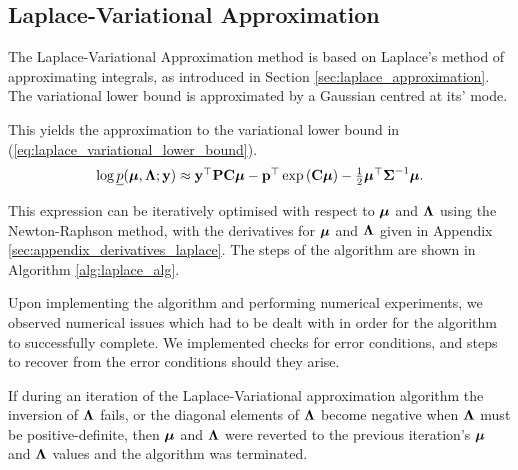\subsection{Laplace-Variational Approximation}
The Laplace-Variational Approximation method is based on Laplace's method of approximating integrals, as
introduced in Section \ref{sec:laplace_approximation}. The variational lower bound  is approximated by a
Gaussian centred at its' mode.

This yields the approximation to the variational lower bound in (\ref{eq:laplace_variational_lower_bound}).
\begin{equation}
\label{eq:laplace_variational_lower_bound}
\begin{array}{ll}
	\log \underline{p}({\boldsymbol \mu}, {\boldsymbol \Lambda}; {\bf y}) \approx {\bf y}^\top{\bf P}{\bf C}{\boldsymbol\mu} - {\bf p}^\top\exp \left ({\bf C} {\boldsymbol \mu} \right ) - \tfrac{1}{2} {\boldsymbol \mu}^\top {\boldsymbol\Sigma}^{-1} {\boldsymbol \mu}. 
\end{array}
\end{equation}
		
\noindent This expression can be iteratively optimised with respect to ${\boldsymbol \mu}$ and ${\boldsymbol \Lambda}$ using the
Newton-Raphson method, with the derivatives for ${\boldsymbol \mu}$ and ${\boldsymbol \Lambda}$ given in Appendix
\ref{sec:appendix_derivatives_laplace}. The steps of the algorithm are shown in Algorithm \ref{alg:laplace_alg}.
		
Upon implementing the algorithm and performing numerical experiments, we observed numerical issues which had to be dealt with in 
order for the algorithm to successfully complete.
We implemented checks for error conditions, and steps to recover from the error conditions should
they arise.

If during an iteration of the Laplace-Variational approximation algorithm the inversion  of ${\boldsymbol \Lambda}$
fails, or the diagonal elements of ${\boldsymbol \Lambda}$ become negative when ${\boldsymbol \Lambda}$ must be positive-definite,
then ${\boldsymbol \mu}$ and ${\boldsymbol \Lambda}$ were reverted to the previous iteration's ${\boldsymbol \mu}$ and ${\boldsymbol \Lambda}$ values and
the algorithm was terminated.

